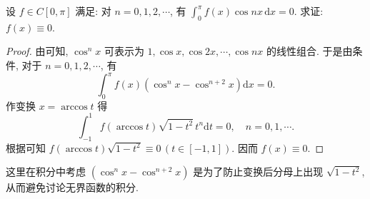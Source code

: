 \documentclass[../../main.tex]{subfiles}
\begin{document}
\begin{example}
设 \( f \in C[0,\pi] \) 满足: 对 \( n = 0,1,2,\cdots \), 有 \( \int_{0}^{\pi} f(x)\cos nx \, \mathrm{d}x = 0 \). 求证: \( f(x) \equiv 0 \).
\end{example}
\begin{proof}
由可知, \( \cos^n x \) 可表示为 \( 1,\cos x,\cos 2x,\cdots,\cos nx \) 的线性组合. 于是由条件, 对于 \( n = 0,1,2,\cdots \), 有
\[
\int_{0}^{\pi} f(x) \left( \cos^n x - \cos^{n + 2} x \right) \mathrm{d}x = 0.
\]
作变换 \( x = \arccos t \) 得
\[
\int_{-1}^{1} f(\arccos t) \sqrt{1 - t^2} \, t^n \mathrm{d}t = 0, \quad n = 0,1,\cdots.
\]
根据可知 \( f(\arccos t) \sqrt{1 - t^2} \equiv 0 \, (t \in [-1,1]) \). 因而 \( f(x) \equiv 0 \).
\end{proof}
\begin{remark}
这里在积分中考虑 \( (\cos^n x - \cos^{n + 2} x) \) 是为了防止变换后分母上出现 \( \sqrt{1 - t^2} \), 从而避免讨论无界函数的积分.
\end{remark}
\end{document}
